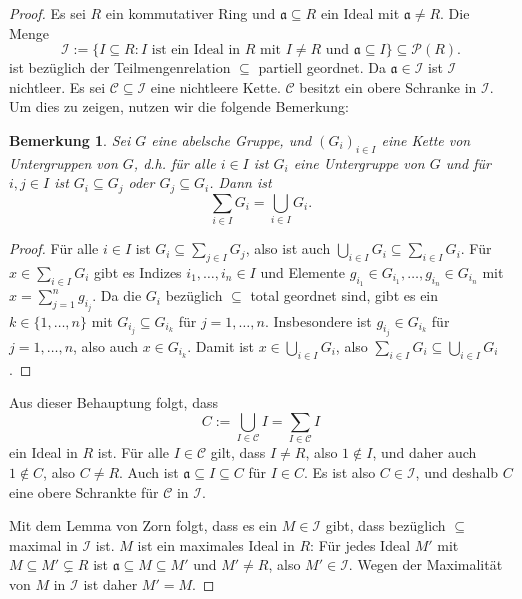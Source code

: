 \documentclass[a4paper,10pt]{article}
\newcounter{satze}
\newtheorem{bem}[satze]{Bemerkung}
\newcommand{\mf}[1]{\mathfrak{#1}}
\newcommand{\mc}[1]{\mathcal{#1}}
\begin{document}
\begin{proof}
Es sei $R$ ein kommutativer Ring und $\mf{a} \subseteq R$ ein Ideal mit $\mf{a} \neq R$. Die Menge
\[
 \mc{I} := \{I \subseteq R : I \text{ ist ein Ideal in $R$ mit $I \neq R$ und $\mf{a} \subseteq I$} \} \subseteq \mc{P}(R).
\]
ist bezüglich der Teilmengenrelation $\subseteq$ partiell geordnet. Da $\mf{a} \in \mc{I}$ ist $\mc{I}$ nichtleer. Es sei $\mc{C} \subseteq \mc{I}$ eine nichtleere Kette. $\mc{C}$ besitzt ein obere Schranke in $\mc{I}$. Um dies zu zeigen, nutzen wir die folgende Bemerkung:

\begin{bem}
 Sei $G$ eine abelsche Gruppe, und $(G_i)_{i \in I}$ eine Kette von Untergruppen von $G$, d.h. für alle $i \in I$ ist $G_i$ eine Untergruppe von $G$ und für $i,j \in I$ ist $G_i \subseteq G_j$ oder $G_j \subseteq G_i$. Dann ist
 \[
  \sum_{i \in I} G_i = \bigcup_{i \in I} G_i.
 \]
\end{bem}
\begin{proof}
 Für alle $i \in I$ ist $G_i \subseteq \sum_{j \in I} G_j$, also ist auch $\bigcup_{i \in I} G_i \subseteq \sum_{i \in I} G_i$. Für $x \in \sum_{i \in I} G_i$ gibt es Indizes $i_1, \ldots, i_n \in I$ und Elemente $g_{i_1} \in G_{i_1}, \ldots, g_{i_n} \in G_{i_n}$ mit $x = \sum_{j=1}^n g_{i_j}$. Da die $G_i$ bezüglich $\subseteq$ total geordnet sind, gibt es ein $k \in \{1, \ldots, n\}$ mit $G_{i_j} \subseteq G_{i_k}$ für $j=1,\ldots,n$. Insbesondere ist $g_{i_j} \in G_{i_k}$ für $j=1,\ldots,n$, also auch $x \in G_{i_k}$. Damit ist $x \in \bigcup_{i \in I} G_i$, also $\sum_{i \in I} G_i \subseteq \bigcup_{i \in I} G_i$.
\end{proof}

Aus dieser Behauptung folgt, dass
\[
 C := \bigcup_{I \in \mc{C}} I = \sum_{I \in \mc{C}} I
\]
ein Ideal in $R$ ist.
Für alle $I \in \mc{C}$ gilt, dass $I \neq R$, also $1 \not\in I$, und daher auch $1 \not\in C$, also $C \neq R$. Auch ist $\mf{a} \subseteq I \subseteq C$ für $I \in C$. Es ist also $C \in \mc{I}$, und deshalb $C$ eine obere Schrankte für $\mc{C}$ in $\mc{I}$.

Mit dem Lemma von Zorn folgt, dass es ein $M \in \mc{I}$ gibt, dass bezüglich $\subseteq$ maximal in $\mc{I}$ ist. $M$ ist ein maximales Ideal in $R$: Für jedes Ideal $M'$ mit $M \subseteq M' \subsetneq R$ ist $\mf{a} \subseteq M \subseteq M'$ und $M' \neq R$, also $M' \in \mc{I}$. Wegen der Maximalität von $M$ in $\mc{I}$ ist daher $M' = M$.
\end{proof}
\end{document}
